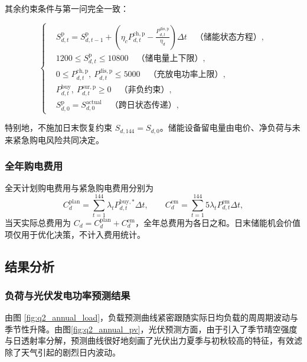 \documentclass[withoutpreface,bwprint]{cumcmthesis}
\begin{document}
其余约束条件与第一问完全一致：


\begin{equation}
	\left\{
	\begin{aligned}
		&S^{\mathrm{p}}_{d,t}=S^{\mathrm{p}}_{d,t-1}+\left(\eta_c P^{\mathrm{ch,p}}_{d,t}-\frac{P^{\mathrm{dis,p}}_{d,t}}{\eta_d}\right)\Delta t\quad \text{（储能状态方程）},\\
		&1200\le S^{\mathrm{p}}_{d,t}\le10800\quad \text{（储电量上下限）},\\
		&0\le P^{\mathrm{ch,p}}_{d,t},\ P^{\mathrm{dis,p}}_{d,t}\le5000\quad \text{（充放电功率上限）},\\
		&P^{\mathrm{buy}}_{d,t},\ P^{\mathrm{sur,p}}_{d,t}\ge0\quad \text{（非负约束）},\\
		&S^{\mathrm{p}}_{d,0}=S^{\mathrm{actual}}_{d,0} \quad \text{（跨日状态传递）},
	\end{aligned}
	\right.
	\label{eq:q2constraints}
\end{equation}

特别地，不施加日末恢复约束 $S_{d,144}=S_{d,0}$。储能设备留电量由电价、净负荷与未来紧急购电风险共同决定。

\subsubsection{全年购电费用}

全天计划购电费用与紧急购电费用分别为
\begin{equation}
	C^{\mathrm{plan}}_d=\sum_{t=1}^{144}\lambda_t P^{\mathrm{buy},*}_{d,t}\Delta t,\qquad
	C^{\mathrm{em}}_d=\sum_{t=1}^{144}5\lambda_t P^{\mathrm{em}}_{d,t}\Delta t,
	\label{eq:q2cost}
\end{equation}
当天实际总费用为 $C_d=C^{\mathrm{plan}}_d+C^{\mathrm{em}}_d$，全年总费用为各日之和。日末储能机会价值项仅用于优化决策，不计入费用统计。

\subsection{结果分析}

\subsubsection{负荷与光伏发电功率预测结果}

由图 \ref{fig:q2_annual_load}，负载预测曲线紧密跟随实际日均负载的周周期波动与季节性升降。由图\ref{fig:q2_annual_pv}，光伏预测方面，由于引入了季节晴空强度与日透射率分解，预测曲线很好地刻画了光伏出力夏季与初秋较高的特征，有效滤除了天气引起的剧烈日内波动。
\end{document}
